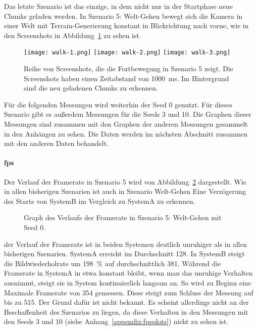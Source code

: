 Das letzte Szenario ist das einzige, in dem nicht nur in der Startphase neue Chunks geladen werden. In Szenario 5: Welt-Gehen bewegt sich die Kamera in einer Welt mit Terrain-Generierung konstant in Blickrichtung nach vorne, wie in den Screenshots in Abbildung~\ref{fig:walk} zu sehen ist.
\begin{figure}[!htbp]
	\centering
	\texttt{[image: walk-1.png]}
	\texttt{[image: walk-2.png]}
	\texttt{[image: walk-3.png]}
	\caption[Reihe von Screenshots, die die Fortbewegung in Szenario 5 zeigt.]{Reihe von Screenshots, die die Fortbewegung in Szenario 5 zeigt. Die Screenshots haben einen Zeitabstand von \SI{1000}{\milli\second}. Im Hintergrund sind die neu geladenen Chunks zu erkennen.}\label{fig:walk}
\end{figure}

Für die folgenden Messungen wird weiterhin der Seed 0 genutzt. Für dieses Szenario gibt es außerdem Messungen für die Seeds 3 und 10. Die Graphen dieser Messungen sind zusammen mit den Graphen der anderen Messungen gesammelt in den Anhängen zu sehen. Die Daten werden im nächsten Abschnitt zusammen mit den anderen Daten behandelt.

\paragraph{\ac{fps}}
Der Verlauf der Framerate in Szenario 5 wird von Abbildung~\ref{fig:seed-0-walk-fps} dargestellt. Wie in allen bisherigen Szenarien ist auch in Szenario Welt-Gehen Eine Verzögerung des Starts von SystemB im Vergleich zu SystemA zu erkennen.
\begin{figure}[!htbp]
	\caption{Graph des Verlaufs der Framerate in Szenario 5: Welt-Gehen mit Seed 0.}\label{fig:seed-0-walk-fps}
\end{figure}
der Verlauf der Framerate ist in beiden Systemen deutlich unruhiger als in allen bisherigen Szenarien. SystemA erreicht im Durchschnitt \SI{128}{\fps}. In SystemB steigt die Bildwiederholrate um \SI{198}{\percent} auf durchschnittlich \SI{381}{\fps}. Während die Framerate in SystemA in etwa konstant bleibt, wenn man das unruhige Verhalten ausnimmt, steigt sie in System kontinuierlich langsam an. So wird zu Beginn eine Maximale Framerate von \SI{354}{\fps} gemessen. Diese steigt zum Schluss der Messung auf bis zu \SI{515}{\fps}. Der Grund dafür ist nicht bekannt. Es scheint allerdings nicht an der Beschaffenheit des Szenarios zu liegen, da diese Verhalten in den Messungen mit den Seeds 3 und 10 (siehe Anhang~\vref{appendix:fpsplots}) nicht zu sehen ist.

